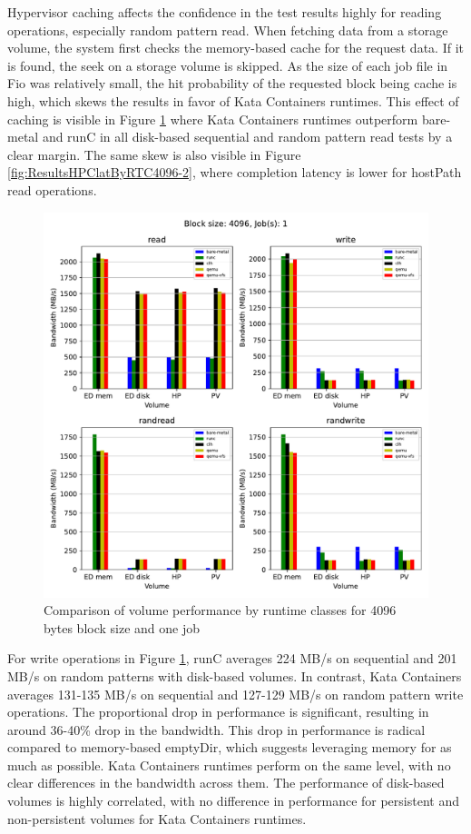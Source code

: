 Hypervisor caching affects the confidence in the test results highly for reading operations, especially random pattern read. When fetching data from a storage volume, the system first checks the memory-based cache for the request data. If it is found, the seek on a storage volume is skipped. As the size of each job file in Fio was relatively small, the hit probability of the requested block being cache is high, which skews the results in favor of Kata Containers runtimes. This effect of caching is visible in Figure \ref{fig:ResultsVolumeByRTC4096-1} where Kata Containers runtimes outperform bare-metal and runC in all disk-based sequential and random pattern read tests by a clear margin. The same skew is also visible in Figure \ref{fig:ResultsHPClatByRTC4096-2}, where completion latency is lower for hostPath read operations.

\begin{figure}[ht]
  \begin{center}
    \includegraphics[width=12cm]{results/subplot_bw_by_volume_with_bare(4096,1).pdf}
    \caption{Comparison of volume performance by runtime classes for 4096 bytes block size and one job}
    \label{fig:ResultsVolumeByRTC4096-1}
  \end{center}
\end{figure}

For write operations in Figure \ref{fig:ResultsVolumeByRTC4096-1}, runC averages 224 MB/s on sequential and 201 MB/s on random patterns with disk-based volumes. In contrast, Kata Containers averages 131-135 MB/s on sequential and 127-129 MB/s on random pattern write operations. The proportional drop in performance is significant, resulting in around 36-40\% drop in the bandwidth. This drop in performance is radical compared to memory-based emptyDir, which suggests leveraging memory for as much as possible. Kata Containers runtimes perform on the same level, with no clear differences in the bandwidth across them. The performance of disk-based volumes is highly correlated, with no difference in performance for persistent and non-persistent volumes for Kata Containers runtimes.
    
